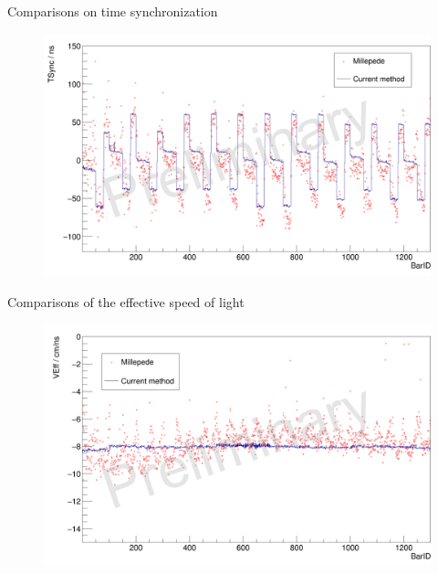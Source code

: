 \documentclass[compress, 13pt, aspectratio=169]{beamer}
\begin{document}
\begin{frame}[t]{Comparisons on time synchronization}
	\begin{figure}[t]
		\vspace*{-1em}
		\centering
		\includegraphics[height = 0.9 \textheight]{tsync_wm.png}
	\end{figure}
\end{frame}

\begin{frame}[t]{Comparisons of the effective speed of light}
	\begin{figure}[t]
		\vspace*{-1em}
		\centering
		\includegraphics[height = 0.9 \textheight]{effective_c_wm.png}
	\end{figure}
\end{frame}
\end{document}

